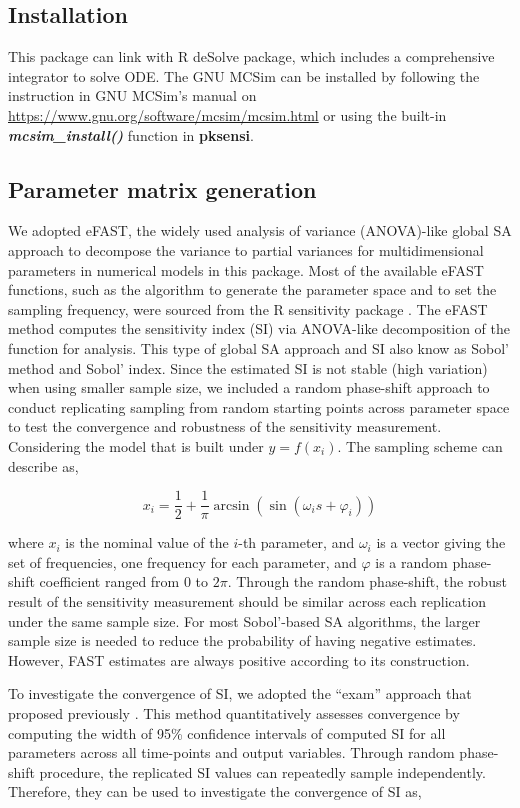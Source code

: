 \documentclass[preprint,12pt, a4paper]{elsarticle}
\begin{document}
\subsection{Installation}

This package can link with R deSolve package,
which includes a comprehensive integrator to solve ODE. The GNU MCSim
can be installed by following the instruction in GNU MCSim's manual on
\url{https://www.gnu.org/software/mcsim/mcsim.html} or using the
built-in \textbf{\textit{mcsim\_install()}} function in \textbf{pksensi}.

\subsection{Parameter matrix generation}

We adopted eFAST, the widely used analysis of variance (ANOVA)-like
global SA approach to decompose the variance to partial variances for
multidimensional parameters in numerical models in this package. Most of
the available eFAST functions, such as the algorithm to generate the
parameter space and to set the sampling frequency, were sourced from the
R sensitivity package \cite{R-sensitivity}. The eFAST method
computes the sensitivity index (SI) via ANOVA-like decomposition of the
function for analysis. This type of global SA approach and SI also know
as Sobol' method and Sobol' index. Since the estimated SI is not stable
(high variation) when using smaller sample size, we included a random
phase-shift approach to conduct replicating sampling from random
starting points across parameter space to test the convergence and
robustness of the sensitivity measurement. Considering the model that is
built under \(y=f(x_{i})\). The sampling scheme can describe as,

\[ x_i = \frac{1}{2} + \frac{1}{\pi}\arcsin(\sin(\omega_is + \varphi_i)) \]


where \(x_i\) is the nominal value of the \(i\)-th parameter, and
\(\omega_i\) is a vector giving the set of frequencies, one frequency
for each parameter, and \(\varphi\) is a random phase-shift coefficient
ranged from 0 to \(2\pi\). Through the random
phase-shift, the robust result of the sensitivity measurement should be
similar across each replication under the same sample size. For most
Sobol'-based SA algorithms, the larger sample size is needed to reduce
the probability of having negative estimates. However, FAST estimates
are always positive according to its construction.

To investigate the convergence of SI, we adopted the ``exam'' approach that
proposed previously \cite{sarrazin2016global}. This method quantitatively
assesses convergence by computing the width of 95\% confidence intervals
of computed SI for all parameters across all time-points and output
variables. Through random phase-shift procedure, the replicated SI
values can repeatedly sample independently. Therefore, they can be used
to investigate the convergence of SI as,
\end{document}
